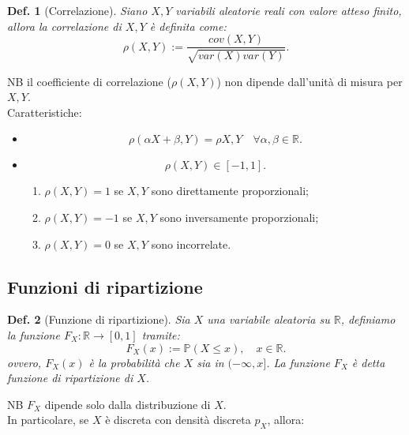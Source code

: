 \documentclass{article}
\newtheorem{definition}{Def.}[section]
\begin{document}
\begin{definition}[Correlazione]
	Siano $X, Y$ variabili aleatorie reali con valore atteso finito, allora la
	correlazione di $X, Y$ è definita come:
	\begin{equation}
		\rho(X, Y) := \frac{cov(X, Y)}{\sqrt{var(X)var(Y)}}.
	\end{equation}
\end{definition}
NB il coefficiente di correlazione ($\rho(X, Y)$) non dipende dall'unità di
misura per $X, Y$.\\
Caratteristiche:
\begin{itemize}
	\item
		\begin{equation*}
			\rho(\alpha X + \beta, Y) = \rho{X, Y} \quad \forall \alpha, \beta \in
			\mathbb{R}.
		\end{equation*}

	\item
		\begin{equation*}
			\rho(X, Y) \in [-1, 1].
		\end{equation*}
		\begin{enumerate}
			\item $\rho(X, Y) = 1$ se $X, Y$ sono direttamente proporzionali;

			\item $\rho(X, Y) = -1$ se $X, Y$ sono inversamente proporzionali;

			\item $\rho(X, Y) = 0$ se $X, Y$ sono incorrelate.
		\end{enumerate}
\end{itemize}

\subsection{Funzioni di ripartizione}
\begin{definition}[Funzione di ripartizione]
	Sia $X$ una variabile aleatoria su $\mathbb{R}$, definiamo la funzione
	$F_X: \mathbb{R} \to [0, 1]$ tramite:
	\begin{equation*}
		F_X(x) := \mathbb{P}(X \leq x), \quad x \in \mathbb{R}.
	\end{equation*}
	ovvero, $F_X(x)$ è la probabilità che $X$ sia in $(-\infty, x]$.
	La funzione $F_X$ è detta funzione di ripartizione di $X$.
\end{definition}
NB $F_X$ dipende solo dalla distribuzione di $X$.\\
In particolare, se $X$ è discreta con densità discreta $p_X$, allora:
\end{document}
